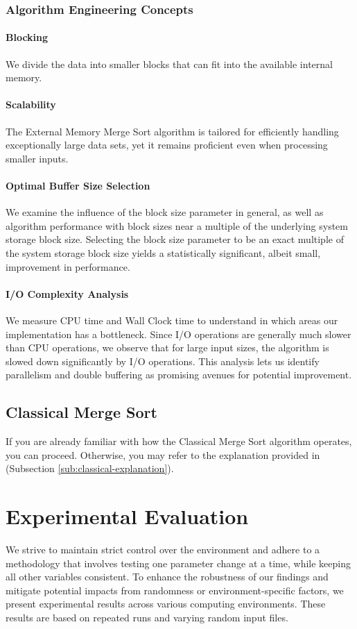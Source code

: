\documentclass[twocolumn]{article}
\begin{document}
\subsubsection*{Algorithm Engineering Concepts}

\paragraph*{Blocking}
We divide the data into smaller blocks that can fit into the available internal memory.
\paragraph*{Scalability}
The External Memory Merge Sort algorithm is tailored for efficiently handling exceptionally large data sets, yet it remains proficient even when processing smaller inputs.
\paragraph*{Optimal Buffer Size Selection}
We examine the influence of the block size parameter in general, as well as algorithm performance with block sizes near a multiple of the underlying system storage block size.
Selecting the block size parameter to be an exact multiple of the system storage block size yields a statistically significant, albeit small, improvement in performance.
\paragraph*{I/O Complexity Analysis}
We measure CPU time and Wall Clock time to understand in which areas our implementation has a bottleneck. Since I/O operations are generally much slower than CPU operations,
we observe that for large input sizes, the algorithm is slowed down significantly by I/O operations. This analysis lets us identify parallelism and double buffering as promising avenues for potential improvement.

\subsection{Classical Merge Sort}
If you are already familiar with how the Classical Merge Sort algorithm operates, you can proceed. Otherwise, you may refer to the explanation provided in (Subsection \ref{sub:classical-explanation}).

\section{Experimental Evaluation}
We strive to maintain strict control over the environment and adhere to a methodology that involves testing one parameter change at a time, while keeping all other variables consistent.
To enhance the robustness of our findings and mitigate potential impacts from randomness or environment-specific factors, we present experimental results across various computing environments. These results are based on repeated runs and varying random input files.
\end{document}
